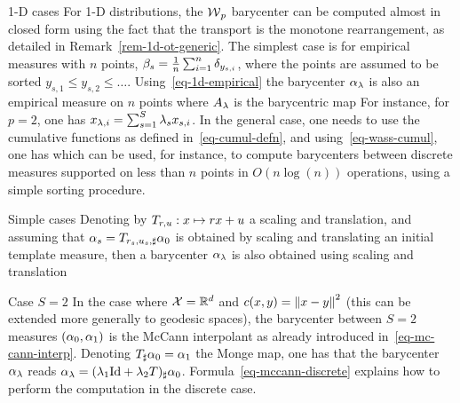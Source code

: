 \begin{rem1}{1-D cases}\label{rem-bary-1d}
	For 1-D distributions, the $\operatorname{\mathcal{W}}_p$ barycenter can be computed almost in closed form using the fact that the transport is the monotone rearrangement, as detailed in Remark~\ref{rem-1d-ot-generic}. 
	The simplest case is for empirical measures with $n$ points, \ie $\beta_s = \frac{1}{n}\sum_{i=1}^n \delta_{y_{s,i}}$, where the points are assumed to be sorted $y_{s,1} \leq y_{s,2} \leq \ldots$. Using~\eqref{eq-1d-empirical} the barycenter $\alpha_\lambda$ is also an empirical measure on $n$ points
	where $A_\lambda$ is the barycentric map
	For instance, for $p=2$, one has $x_{\lambda,i} = \sum_{s=1}^S \lambda_s x_{s,i}$. 
	In the general case, one needs to use the cumulative functions as defined in~\eqref{eq-cumul-defn}, and using~\eqref{eq-wass-cumul}, one has
	which can be used, for instance, to compute barycenters between discrete measures supported on less than $n$ points in $O(n\log(n))$ operations, using a simple sorting procedure.
\end{rem1}



\begin{rem1}{Simple cases}
	Denoting by $T_{r,u} : x \mapsto rx+u$ a scaling and translation, and assuming that $\alpha_{s} = T_{r_s,u_s,\sharp} \alpha_0$ is obtained by scaling and translating an initial template measure, then a barycenter $\alpha_\lambda$ is also obtained using scaling and translation 
\end{rem1}


\begin{rem1}{Case $S=2$}
	In the case where $\mathcal{X}=\mathbb{R}^d$ and $c(x,y)=\left\| x-y \right\|^2$ (this can be extended more generally to geodesic spaces), the barycenter between $S=2$ measures $(\alpha_0,\alpha_1)$ is the McCann interpolant as already introduced in~\eqref{eq-mc-cann-interp}. Denoting $T_\sharp \alpha_0=\alpha_1$ the Monge map, one has that the barycenter $\alpha_\lambda$ reads $\alpha_\lambda = (\lambda_1 \mathrm{Id} + \lambda_2 T)_{\sharp} \alpha_0$.
	Formula~\eqref{eq-mccann-discrete} explains how to perform the computation in the discrete case.
\end{rem1}



